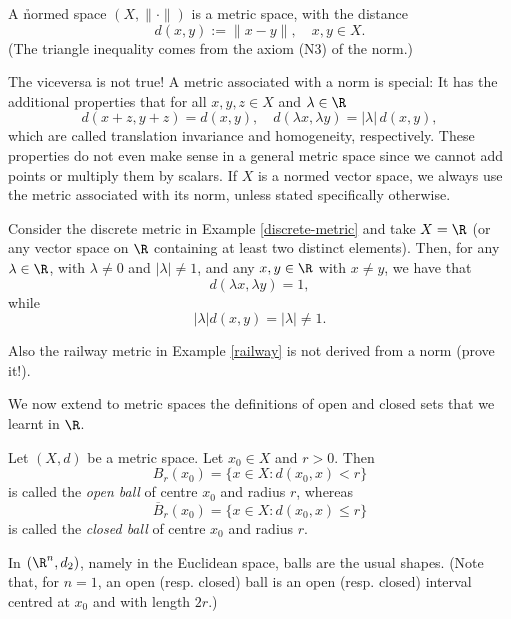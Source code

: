\begin{remark}
A \h{normed space} $(X,\|\cdot\|)$ is a metric space, with the distance
$$
d(x,y):= \|x-y\|, \quad x,y\in X.
$$
(The triangle inequality comes from the axiom (N3) of the norm.)

\medskip

The viceversa is not true! A metric associated with a norm is special: It has the additional properties that for all $x, y, z \in X$ and $\lambda\in \R$
$$d(x + z,y + z) = d(x,y), \quad d(\lambda x,\lambda y) = |\lambda| \, d(x,y),$$
which are called translation invariance and homogeneity, respectively. These properties do not even make sense in a general metric space since we cannot add points or multiply them by scalars. If $X$ is a normed vector space, we always use the metric associated with its norm, unless stated specifically otherwise.
\end{remark}

\np

\begin{example}
Consider the discrete metric in Example \ref{discrete-metric} and take $X=\R$ (or any vector space on $\R$ containing at least two distinct elements). Then, for any $\lambda\in \R$, with $\lambda\neq 0$ and $|\lambda|\neq 1$, and any $x,y \in \R$ with $x\neq y$, we have that 
$$
d(\lambda x, \lambda y) =1,
$$
while 
$$
|\lambda| d(x,y) = |\lambda| \neq 1.
$$
\medskip

Also the railway metric in Example \ref{railway} is not derived from a norm (prove it!).

\end{example}


We now extend to metric spaces the definitions of open and closed sets that we learnt in $\R$.



\begin{definition} \label{def:ball}
Let $(X,d)$ be a metric space. Let $x_0 \in X$ and $r > 0$. Then
\[
B_r(x_0) = \{x \in X: d(x_0,x) < r\}
\]
is called the \emph{open ball} of centre $x_0$ and radius $r$, whereas
\[
\overline{B}_r(x_0) = \{x \in X: d(x_0,x) \leq r\}
\]
is called the \emph{closed ball} of centre $x_0$ and radius $r$.
\end{definition}

\begin{example}
In $(\R^n, d_2)$, namely in the Euclidean space, balls are the usual shapes. (Note that, for $n=1$, an open (resp. closed) ball is an open (resp. closed) interval centred at $x_0$ and with length $2r$.)
\end{example}

